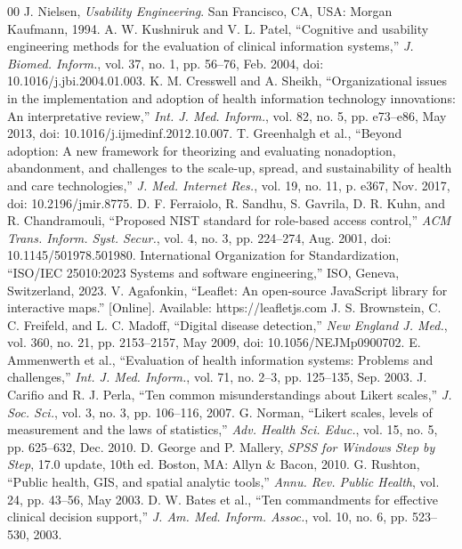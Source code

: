\documentclass[conference]{IEEEtran}
\begin{document}
\begin{thebibliography}{00}
 J. Nielsen, \textit{Usability Engineering}. San Francisco, CA, USA: Morgan Kaufmann, 1994.
 A. W. Kushniruk and V. L. Patel, ``Cognitive and usability engineering methods for the evaluation of clinical information systems,'' \textit{J. Biomed. Inform.}, vol. 37, no. 1, pp. 56--76, Feb. 2004, doi: 10.1016/j.jbi.2004.01.003.
 K. M. Cresswell and A. Sheikh, ``Organizational issues in the implementation and adoption of health information technology innovations: An interpretative review,'' \textit{Int. J. Med. Inform.}, vol. 82, no. 5, pp. e73--e86, May 2013, doi: 10.1016/j.ijmedinf.2012.10.007.
 T. Greenhalgh et al., ``Beyond adoption: A new framework for theorizing and evaluating nonadoption, abandonment, and challenges to the scale-up, spread, and sustainability of health and care technologies,'' \textit{J. Med. Internet Res.}, vol. 19, no. 11, p. e367, Nov. 2017, doi: 10.2196/jmir.8775.
 D. F. Ferraiolo, R. Sandhu, S. Gavrila, D. R. Kuhn, and R. Chandramouli, ``Proposed NIST standard for role-based access control,'' \textit{ACM Trans. Inform. Syst. Secur.}, vol. 4, no. 3, pp. 224--274, Aug. 2001, doi: 10.1145/501978.501980.
 International Organization for Standardization, ``ISO/IEC 25010:2023 Systems and software engineering,'' ISO, Geneva, Switzerland, 2023.
 V. Agafonkin, ``Leaflet: An open-source JavaScript library for interactive maps.'' [Online]. Available: https://leafletjs.com
 J. S. Brownstein, C. C. Freifeld, and L. C. Madoff, ``Digital disease detection,'' \textit{New England J. Med.}, vol. 360, no. 21, pp. 2153--2157, May 2009, doi: 10.1056/NEJMp0900702.
 E. Ammenwerth et al., ``Evaluation of health information systems: Problems and challenges,'' \textit{Int. J. Med. Inform.}, vol. 71, no. 2--3, pp. 125--135, Sep. 2003.
 J. Carifio and R. J. Perla, ``Ten common misunderstandings about Likert scales,'' \textit{J. Soc. Sci.}, vol. 3, no. 3, pp. 106--116, 2007.
 G. Norman, ``Likert scales, levels of measurement and the laws of statistics,'' \textit{Adv. Health Sci. Educ.}, vol. 15, no. 5, pp. 625--632, Dec. 2010.
 D. George and P. Mallery, \textit{SPSS for Windows Step by Step}, 17.0 update, 10th ed. Boston, MA: Allyn \& Bacon, 2010.
 G. Rushton, ``Public health, GIS, and spatial analytic tools,'' \textit{Annu. Rev. Public Health}, vol. 24, pp. 43--56, May 2003.
 D. W. Bates et al., ``Ten commandments for effective clinical decision support,'' \textit{J. Am. Med. Inform. Assoc.}, vol. 10, no. 6, pp. 523--530, 2003.

\end{thebibliography}
\end{document}

